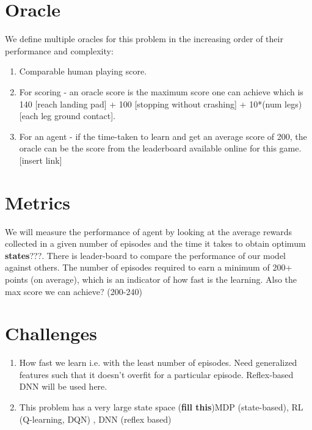 \documentclass[12pt]{article}
\begin{document}
\section{Oracle}
We define multiple oracles for this problem in the increasing order of their performance and complexity:
\begin{enumerate}[label=(\alph*)]
\item Comparable human playing score.
\item For scoring - an oracle score is the maximum score one can achieve which is 140 [reach landing pad]  + 100 [stopping without crashing] + 10*(num legs) [each leg ground contact].
\item For an agent - if the time-taken to learn and get an average score of 200, the oracle can be the score from the leaderboard available online for this game. [insert link]
\end{enumerate}

\section{Metrics}
We will measure the performance of agent by looking at the average rewards collected in a given number of episodes and the time it takes to obtain optimum \textbf{states}???. There is leader-board to compare the performance of our model against others. \citep{leaderboard}
\newline
 The number of episodes required to earn a minimum of 200+ points (on average), which is an indicator of how fast is the learning.\newline
Also the max score we can achieve? (200-240)


\section{Challenges}
\begin{enumerate}[label=(\alph*)]
\item How fast we learn i.e. with the least number of episodes. Need generalized features such that it doesn’t overfit for a particular episode. Reflex-based DNN will be used here.
\item This problem has a very large state space (\textbf{fill this})MDP (state-based), RL (Q-learning, DQN) , DNN (reflex based)
\end{enumerate}



\end{document}
